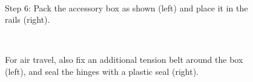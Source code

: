 \begin{figure}[!ht]
\centering
\mbox{\quad
{}}
\caption{Step 6: Pack the accessory box as shown (left) and place it in the rails (right).} %
\end{figure}

\begin{figure}[!ht]
\centering
\mbox{\quad
{}}
\caption{For air travel, also fix an additional tension belt around the box (left), and seal the hinges with a plastic seal (right).} %
\end{figure}
